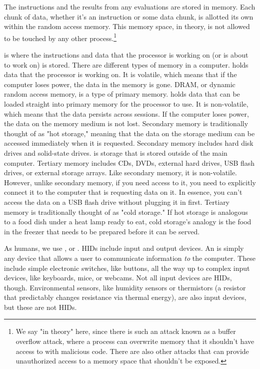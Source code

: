 The instructions and the results from any evaluations are stored in memory. Each chunk of data, whether it's an instruction or some data chunk, is allotted its own  within the random access memory. This memory space, in theory, is not allowed to be touched by any other process.\footnote{We say "in theory" here, since there is such an attack known as a buffer overflow attack, where a process can overwrite memory that it shouldn't have access to with malicious code. There are also other attacks that can provide unauthorized access to a memory space that shouldn't be exposed.}\par
{} is where the instructions and data that the processor is working on (or is about to work on) is stored. There are different types of memory in a computer.  holds data that the processor is working on. It is volatile, which means that if the computer loses power, the data in the memory is gone. DRAM, or dynamic random access memory, is a type of primary memory.  holds data that can be loaded straight into primary memory for the processor to use. It is non-volatile, which means that the data persists across sessions. If the computer loses power, the data on the memory medium is not lost. Secondary memory is traditionally thought of as "hot storage," meaning that the data on the storage medium can be accessed immediately when it is requested. Secondary memory includes hard disk drives and solid-state drives.  is storage that is stored outside of the main computer. Tertiary memory includes CDs, DVDs, external hard drives, USB flash drives, or external storage arrays. Like secondary memory, it is non-volatile. However, unlike secondary memory, if you need access to it, you need to explicitly connect it to the computer that is requesting data on it. In essence, you can't access the data on a USB flash drive without plugging it in first. Tertiary memory is traditionally thought of as "cold storage." If hot storage is analogous to a food dish under a heat lamp ready to eat, cold storage's analogy is the food in the freezer that needs to be prepared before it can be served.\par
As humans, we use , or . HIDs include input and output devices. An  is simply any device that allows a user to communicate information \textit{to} the computer. These include simple electronic switches, like buttons, all the way up to complex input devices, like keyboards, mice, or webcams. Not all input devices are HIDs, though. Environmental sensors, like humidity sensors or thermistors (a resistor that predictably changes resistance via thermal energy), are also input devices, but these are not HIDs.\par
